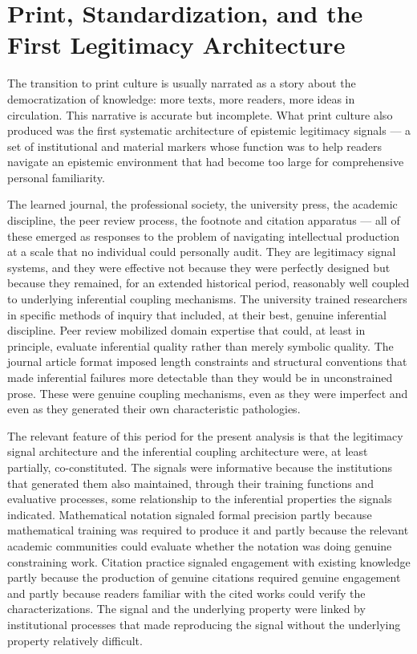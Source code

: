 \documentclass[12pt, openright, twoside]{book}
\begin{document}
\section{Print, Standardization, and the First Legitimacy Architecture}

The transition to print culture is usually narrated as a story about the
democratization of knowledge: more texts, more readers, more ideas in
circulation. This narrative is accurate but incomplete. What print culture
also produced was the first systematic architecture of epistemic legitimacy
signals --- a set of institutional and material markers whose function was
to help readers navigate an epistemic environment that had become too large
for comprehensive personal familiarity.

The learned journal, the professional society, the university press, the
academic discipline, the peer review process, the footnote and citation
apparatus --- all of these emerged as responses to the problem of
navigating intellectual production at a scale that no individual could
personally audit. They are legitimacy signal systems, and they were effective
not because they were perfectly designed but because they remained, for an
extended historical period, reasonably well coupled to underlying inferential
coupling mechanisms. The university trained researchers in specific methods
of inquiry that included, at their best, genuine inferential discipline.
Peer review mobilized domain expertise that could, at least in principle,
evaluate inferential quality rather than merely symbolic quality. The journal
article format imposed length constraints and structural conventions that made
inferential failures more detectable than they would be in unconstrained
prose. These were genuine coupling mechanisms, even as they were imperfect
and even as they generated their own characteristic pathologies.

The relevant feature of this period for the present analysis is that the
legitimacy signal architecture and the inferential coupling architecture
were, at least partially, co-constituted. The signals were informative because
the institutions that generated them also maintained, through their training
functions and evaluative processes, some relationship to the inferential
properties the signals indicated. Mathematical notation signaled formal
precision partly because mathematical training was required to produce it
and partly because the relevant academic communities could evaluate whether
the notation was doing genuine constraining work. Citation practice signaled
engagement with existing knowledge partly because the production of genuine
citations required genuine engagement and partly because readers familiar with
the cited works could verify the characterizations. The signal and the
underlying property were linked by institutional processes that made
reproducing the signal without the underlying property relatively difficult.
\end{document}
